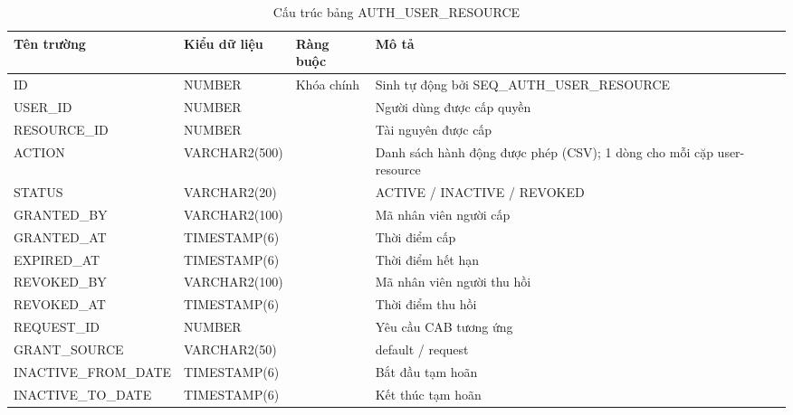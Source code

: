 \documentclass[../DoAn.tex]{subfiles}
\begin{document}
\begin{table}[H]
\centering
\caption{Cấu trúc bảng AUTH\_USER\_RESOURCE}
\label{tab:auth-user-resource}
\footnotesize
\begin{tabular}{|p{3.0cm}|p{2.3cm}|p{2.7cm}|p{4.5cm}|}
\hline
\textbf{Tên trường} & \textbf{Kiểu dữ liệu} & \textbf{Ràng buộc} & \textbf{Mô tả} \\ \hline
ID & NUMBER & Khóa chính & Sinh tự động bởi SEQ\_AUTH\_USER\_RESOURCE \\ \hline
USER\_ID & NUMBER & & Người dùng được cấp quyền \\ \hline
RESOURCE\_ID & NUMBER & & Tài nguyên được cấp \\ \hline
ACTION & VARCHAR2(500) & & Danh sách hành động được phép (CSV); 1 dòng cho mỗi cặp user-resource \\ \hline
STATUS & VARCHAR2(20) & & ACTIVE / INACTIVE / REVOKED \\ \hline
GRANTED\_BY & VARCHAR2(100) & & Mã nhân viên người cấp \\ \hline
GRANTED\_AT & TIMESTAMP(6) & & Thời điểm cấp \\ \hline
EXPIRED\_AT & TIMESTAMP(6) & & Thời điểm hết hạn \\ \hline
REVOKED\_BY & VARCHAR2(100) & & Mã nhân viên người thu hồi \\ \hline
REVOKED\_AT & TIMESTAMP(6) & & Thời điểm thu hồi \\ \hline
REQUEST\_ID & NUMBER & & Yêu cầu CAB tương ứng \\ \hline
GRANT\_SOURCE & VARCHAR2(50) & & default / request \\ \hline
INACTIVE\_FROM\_DATE & TIMESTAMP(6) & & Bắt đầu tạm hoãn \\ \hline
INACTIVE\_TO\_DATE & TIMESTAMP(6) & & Kết thúc tạm hoãn \\ \hline
\end{tabular}
\end{table}
\end{document}
